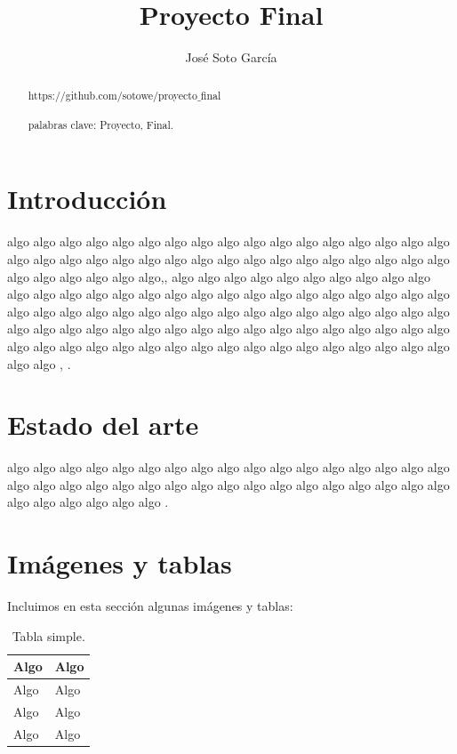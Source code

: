 \documentclass[a4paper]{article}
\title{Proyecto Final}
\author{José Soto García}
\begin{document}
\maketitle
\begin{abstract}
https://github.com/sotowe/proyecto$\_$final\\\\
palabras clave: Proyecto, Final. 
\end{abstract}
\section{Introducción}
algo algo algo algo algo algo algo algo algo algo algo algo algo algo algo algo algo algo algo algo algo algo algo algo algo algo algo algo algo algo algo algo algo algo algo algo algo algo algo algo\cite{bransden2000},\cite{krane1988}, algo algo algo algo algo algo algo algo algo algo algo algo algo algo algo algo algo algo algo algo algo algo algo algo algo algo algo algo algo algo algo algo algo algo algo algo algo algo algo algo algo algo algo algo algo algo algo algo algo algo algo algo algo algo algo algo algo algo algo algo algo algo algo algo algo algo algo algo algo algo algo algo algo algo algo algo algo algo algo algo \cite{bransden2000}, \cite{tipler2007physics}.
\section{Estado del arte}
algo algo algo algo algo algo algo algo algo algo algo algo algo algo algo algo algo algo algo algo algo algo algo algo algo algo algo algo algo algo algo algo algo algo algo algo algo algo algo algo \cite{kittel1963quantum}.
\section{Imágenes y tablas}
Incluimos en esta sección algunas imágenes y tablas:
\begin{table}[h]
\begin{center}
\begin{tabular}{|l|l|}
\hline
Algo & Algo \\
\hline \hline
Algo & Algo \\ \hline
Algo & Algo \\ \hline
Algo & Algo \\ \hline
\end{tabular}
\caption{Tabla simple.}
\label{tabla:sencilla}
\end{center}
\end{table}
\end{document}

